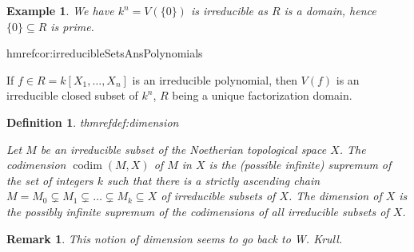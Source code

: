 \documentclass[DIV=14,parskip=full,pointednumbers]{scrartcl}
\theoremstyle{cthm}
\theoremstyle{cvarthm}
\theoremstyle{cdef}
\newtheorem{defi}{Definition}[subsection]
\newtheorem{example}{Example}[subsection]
\newtheorem*{rem*}{Remark}
\newcommand{\lbl}[1]{
	\label{#1}
	\edef\dummy{\curthm}
	\expandafter\xdef\csname thmref#1\endcsname{\dummy}
}
\newcommand{\codim}{\operatorname{codim}}
\begin{document}
\begin{example}
 We have $k^n = V(\{0\})$ is irreducible as $R$ is a domain, hence $\{0\}\subseteq R$ is prime.
\end{example}
\begin{cor}\lbl{cor:irreducibleSetsAnsPolynomials}
 If $f\in R = k[X_1,\ldots, X_n]$ is an irreducible polynomial, then $V(f)$ is an irreducible closed subset of $k^n$, $R$ being a unique factorization domain.
\end{cor}
\begin{defi}\lbl{def:dimension}
 Let $M$ be an irreducible subset of the Noetherian topological space $X$. The \emph{codimension} $\codim(M,X)$ of $M$ in $X$ is the (possible infinite) supremum of the set of integers $k$ such that there is a strictly ascending chain $M=M_0\subsetneq M_1\subsetneq \ldots \subsetneq M_k\subseteq X$ of irreducible subsets of $X$. The \emph{dimension} of $X$ is the possibly infinite supremum of the codimensions of all irreducible subsets of $X$.
\end{defi}
\begin{rem*}
 This notion of dimension seems to go back to W. Krull.
\end{rem*}
\setcounter{temp}{\theequation}
\setcounter{equation}{0}
\end{document}
